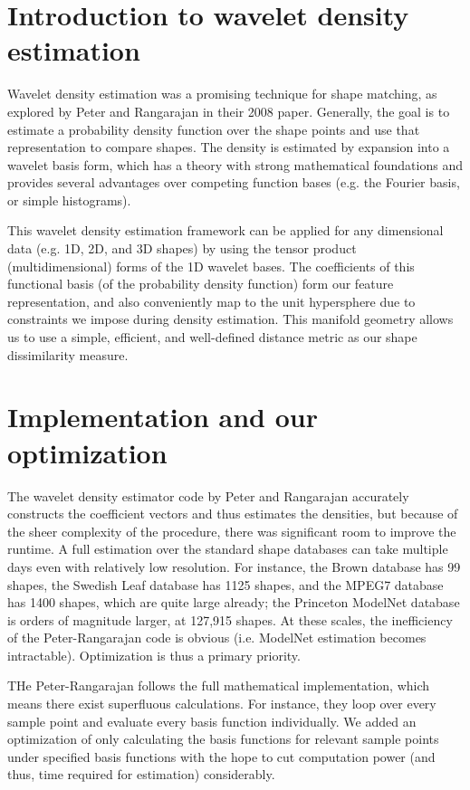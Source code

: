 \documentclass[../tech_report_1.tex]{subfiles}
\begin{document}
\section{Introduction to wavelet density estimation}

Wavelet density estimation was a promising technique for shape matching, as explored by Peter and Rangarajan in their 2008 paper\cite{peter2008maximum}. Generally, the goal is to estimate a probability density function over the shape points and use that representation to compare shapes. The density is estimated by expansion into a wavelet basis form, which has a theory with strong mathematical foundations and provides several advantages over competing function bases (e.g. the Fourier basis, or simple histograms). 

This wavelet density estimation framework can be applied for any dimensional data (e.g. 1D, 2D, and 3D shapes) by using the tensor product (multidimensional) forms of the 1D wavelet bases. The coefficients of this functional basis (of the probability density function) form our feature representation, and also conveniently map to the unit hypersphere due to constraints we impose during density estimation. This manifold geometry allows us to use a simple, efficient, and well-defined distance metric as our shape dissimilarity measure.

\section{Implementation and our optimization}

The wavelet density estimator code by Peter and Rangarajan accurately constructs the coefficient vectors and thus estimates the densities, but because of the sheer complexity of the procedure, there was significant room to improve the runtime. A full estimation over the standard shape databases can take multiple days even with relatively low resolution.
For instance, the Brown database\cite{sebastian2004recognition} has 99 shapes, the Swedish Leaf database\cite{soderkvist2001computer} has 1125 shapes, and the MPEG7 database\cite{jeannin1999description, bober2001mpeg} has 1400 shapes, which are quite large already; the Princeton ModelNet database is orders of magnitude larger, at 127,915 shapes. At these scales, the inefficiency of the Peter-Rangarajan code is obvious (i.e. ModelNet estimation becomes intractable). Optimization is thus a primary priority.

THe Peter-Rangarajan follows the full mathematical implementation, which means there exist superfluous calculations. For instance, they loop over every sample point and evaluate every basis function individually. We added an optimization of only calculating the basis functions
for relevant sample points under specified basis functions with the
hope to cut computation power (and thus, time required for estimation) considerably.
\end{document}
